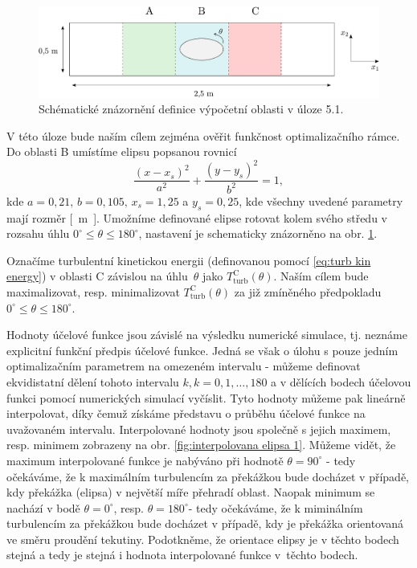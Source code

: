 \begin{figure}[H]
	\centering
	\vspace{8mm}
	\includegraphics[width=1.0	\textwidth]{Images/elipsa1.pdf}
	\vspace{2mm}
	\caption{Schématické znázornění definice výpočetní oblasti v úloze 5.1.}
	\label{fig:elipsa 1}
	\vspace{1.8mm}
\end{figure}

V této úloze bude naším cílem zejména ověřit funkčnost optimalizačního rámce. Do oblasti B umístíme elipsu popsanou rovnicí
\begin{equation}
	\frac{(x-x_s)^2}{a^2} + \frac{(y-y_s)^2}{b^2} = 1,
\end{equation}
kde $ a = 0{,}21, \, b = 0{,}105, \, x_s = 1{,}25$ a $ y_s = 0{,}25 $, kde všechny uvedené parametry mají rozměr \si{[m]}. Umožníme definované elipse rotovat kolem svého středu v rozsahu úhlu $0^\circ \leq \theta \leq 180^\circ$, nastavení je schematicky znázorněno na obr. \ref{fig:elipsa 1}.

Označíme turbulentní kinetickou energii (definovanou pomocí \eqref{eq:turb kin energy}) v oblasti C závislou na úhlu~$ \theta $ jako $ T^{\text{C}}_{\text{turb}} (\theta) $. Naším cílem bude maximalizovat, resp. minimalizovat $ T^{\text{C}}_{\text{turb}} (\theta) $ za již zmíněného předpokladu $0^\circ \leq \theta \leq 180^\circ$.

Hodnoty účelové funkce jsou závislé na výsledku numerické simulace, tj. neznáme explicitní funkční předpis účelové funkce. Jedná se však o úlohu s pouze jedním optimalizačním parametrem na omezeném intervalu - můžeme definovat ekvidistatní dělení tohoto intervalu $ k, k=0,1,\dots,180$ a v dělících bodech účelovou funkci pomocí numerických simulací vyčíslit. Tyto hodnoty můžeme pak lineárně interpolovat, díky čemuž získáme představu o průběhu účelové funkce na uvažovaném intervalu. Interpolované hodnoty jsou společně s jejich maximem, resp. minimem zobrazeny na obr. \ref{fig:interpolovana elipsa 1}. Můžeme vidět, že maximum interpolované funkce je nabýváno při hodnotě $ \theta = 90^\circ $ - tedy očekáváme, že k maximálním turbulencím za překážkou bude docházet v případě, kdy překážka (elipsa) v největší míře přehradí oblast. Naopak minimum se nachází v bodě $ \theta = 0^\circ $, resp. $ \theta = 180^\circ $- tedy očekáváme, že k miminálním turbulencím za překážkou bude docházet v případě, kdy je překážka orientovaná ve směru proudění tekutiny. Podotkněme, že orientace elipsy je v těchto bodech stejná a tedy je stejná i hodnota interpolované funkce v~těchto bodech.

